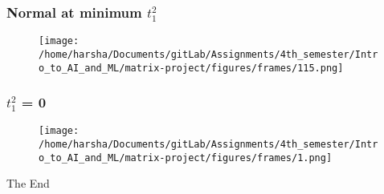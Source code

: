 \documentclass[12pt]{beamer}
\begin{document}

\begin{frame}
\frametitle{Normal at minimum $t_1^2$}
\begin{figure}
\centering
\texttt{[image: /home/harsha/Documents/gitLab/Assignments/4th\_semester/Intro\_to\_AI\_and\_ML/matrix-project/figures/frames/115.png]}
\label{Normal at minimum $t_1^2$}
\end{figure}
\end{frame}


\begin{frame}
\frametitle{$t_1^2$ = 0}
\begin{figure}
\centering
\texttt{[image: /home/harsha/Documents/gitLab/Assignments/4th\_semester/Intro\_to\_AI\_and\_ML/matrix-project/figures/frames/1.png]}
\label{$t_1^2 = 0$}
\end{figure}
\end{frame}


\begin{frame}
\Huge{\centerline{The End}}
\end{frame}

\end{document}
